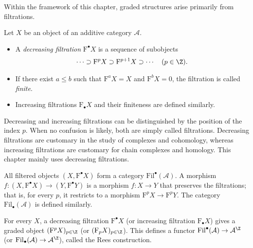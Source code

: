 Within the framework of this chapter, graded structures arise primarily from
filtrations.

\begin{definition}\label{def:filtration}
	Let $X$ be an object of an additive category $\mathcal{A}$.
	\begin{itemize}
		\item A \emph{decreasing filtration} $\mathrm{F}^\bullet X$ is a
		sequence of subobjects
		\[ \cdots \supset \mathrm{F}^p X \supset \mathrm{F}^{p+1} X \supset \cdots \quad (p \in \Z). \]
		\item If there exist $a\leq b$ such that $\mathrm{F}^aX=X$ and
		$\mathrm{F}^bX=0$, the filtration is called \emph{finite}.
		\item Increasing filtrations $\mathrm{F}_\bullet X$ and their finiteness
		are defined similarly.
	\end{itemize}
\end{definition}

Decreasing and increasing filtrations can be distinguished by the position of
the index $p$. When no confusion is likely, both are simply called
filtrations. Decreasing filtrations are customary in the study of complexes
and cohomology, whereas increasing filtrations are customary for chain
complexes and homology. This chapter mainly uses decreasing filtrations.

All filtered objects $(X,\mathrm{F}^\bullet X)$ form a category
$\mathrm{Fil}^\bullet(\mathcal{A})$. A morphism
$f:(X,\mathrm{F}^\bullet X)\to(Y,\mathrm{F}^\bullet Y)$ is a morphism
$f:X\to Y$ that preserves the filtrations; that is, for every $p$, it
restricts to a morphism $\mathrm{F}^pX\to\mathrm{F}^pY$. The category
$\mathrm{Fil}_\bullet(\mathcal{A})$ is defined similarly.

For every $X$, a decreasing filtration $\mathrm{F}^\bullet X$ (or increasing
filtration $\mathrm{F}_\bullet X$) gives a graded object
$(\mathrm{F}^pX)_{p\in\Z}$ (or $(\mathrm{F}_pX)_{p\in\Z}$). This defines a
functor $\mathrm{Fil}^\bullet(\mathcal{A})\to\mathcal{A}^{\Z}$ (or
$\mathrm{Fil}_\bullet(\mathcal{A})\to\mathcal{A}^{\Z}$), called the Rees
construction.

